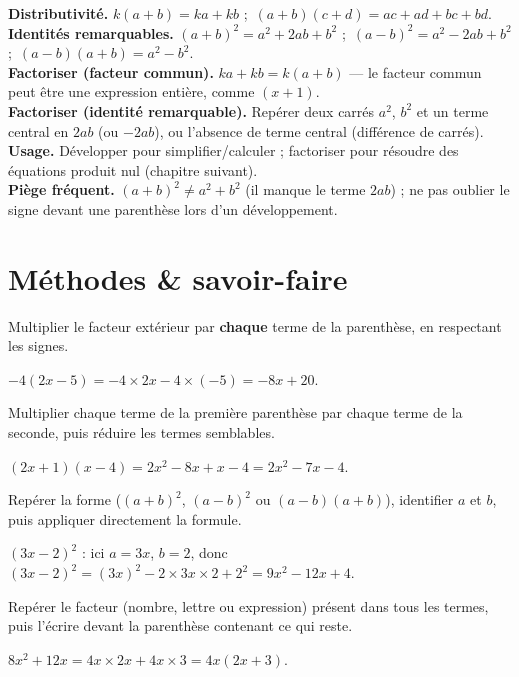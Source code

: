 \begin{synthese}
\textbf{Distributivité.} $k(a+b)=ka+kb$ ;\ $(a+b)(c+d)=ac+ad+bc+bd$.\\[4pt]
\textbf{Identités remarquables.} $(a+b)^{2}=a^{2}+2ab+b^{2}$ ;\
$(a-b)^{2}=a^{2}-2ab+b^{2}$ ;\ $(a-b)(a+b)=a^{2}-b^{2}$.\\[4pt]
\textbf{Factoriser (facteur commun).} $ka+kb=k(a+b)$ — le facteur commun peut être une
expression entière, comme $(x+1)$.\\[4pt]
\textbf{Factoriser (identité remarquable).} Repérer deux carrés $a^{2}$, $b^{2}$ et un
terme central en $2ab$ (ou $-2ab$), ou l'absence de terme central (différence de carrés).\\[4pt]
\textbf{Usage.} Développer pour simplifier/calculer ; factoriser pour résoudre des équations
produit nul (chapitre suivant).\\[4pt]
\textbf{Piège fréquent.} $(a+b)^{2}\ne a^{2}+b^{2}$ (il manque le terme $2ab$) ; ne pas
oublier le signe devant une parenthèse lors d'un développement.
\end{synthese}

\section{Méthodes \& savoir-faire}

Multiplier le facteur extérieur par \textbf{chaque} terme de la parenthèse, en respectant les
signes.
\begin{exemple}
$-4(2x-5)=-4\times2x-4\times(-5)=-8x+20$.
\end{exemple}

Multiplier chaque terme de la première parenthèse par chaque terme de la seconde, puis
réduire les termes semblables.
\begin{exemple}
$(2x+1)(x-4)=2x^{2}-8x+x-4=2x^{2}-7x-4$.
\end{exemple}

Repérer la forme ($(a+b)^{2}$, $(a-b)^{2}$ ou $(a-b)(a+b)$), identifier $a$ et $b$, puis
appliquer directement la formule.
\begin{exemple}
$(3x-2)^{2}$ : ici $a=3x$, $b=2$, donc $(3x-2)^{2}=(3x)^{2}-2\times3x\times2+2^{2}=9x^{2}-12x+4$.
\end{exemple}

Repérer le facteur (nombre, lettre ou expression) présent dans tous les termes, puis
l'écrire devant la parenthèse contenant ce qui reste.
\begin{exemple}
$8x^{2}+12x=4x\times2x+4x\times3=4x(2x+3)$.
\end{exemple}

